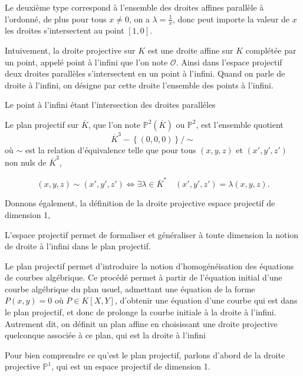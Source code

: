 Le deuxième type correspond à l'ensemble des droites affines parallèle à l'ordonné, de plus
pour tous $x \neq 0$, on a $\lambda = \frac{1}{x}$, donc peut importe la valeur de $x$ les
droites s'intersectent au point $[1,0]$.

Intuivement, la droite projective sur $K$ est une droite affine sur $K$ complétée par un
point, appelé point à l'infini que l'on note $\mathcal{O}$. Ainsi dans l'espace projectif deux droites parallèles s'intersectent en
un point à l'infini. Quand on parle de droite à l'infini, on désigne par cette droite
l'ensemble des points à l'infini.

Le point à l'infini étant l'intersection des droites paralléles 

\begin{definition}
    Le plan projectif sur $\overline{K}$, que l'on note $\mathbb{P}^2(\overline{K})$ ou
    $\mathbb{P}^2$, est l'ensemble quotient
    \[
    \overline{K}^3 - \left\{ (0,0,0) \right\} / \sim
    \] 
    où $\sim$ est la relation d'équivalence telle que pour tous $\left( x,y,z \right) $ et
    $\left( x',y',z'\right) $ non nuls de $\overline{K}^3$,

    \[
    \left( x,y,z \right) \sim \left( x',y',z' \right) \iff \exists \lambda \in
    \overline{K}^{*} \quad \left( x',y',z' \right) = \lambda \left( x,y,z \right) 
    .\] 
\end{definition}

Donnons également, la définition de la droite projective espace projectif de dimension 1,



L'espace projectif permet de formaliser et généraliser à toute dimension la notion de
droite à l'infini dans le plan projectif.

Le plan projectif permet d'introduire la notion d'homogénéisation des équations de courbes algébrique.
Ce procédé permet à partir de l'équation initial d'une courbe algébrique du plan usuel,
admettant une équation de la forme $P(x,y)=0$ où $P \in K[X,Y]$, d'obtenir une équation d'une courbe qui
est dans le plan projectif, et donc de prolonge la courbe initiale à la droite à
l'infini. Autrement dit, on définit un plan affine en choisissant une droite projective
quelconque associée à ce plan, qui est la droite à l'infini 

Pour bien comprendre ce qu'est le plan projectif, parlons d'abord de la droite projective
$\mathbb{P}^{1}$, qui est un espace projectif de dimension 1.

